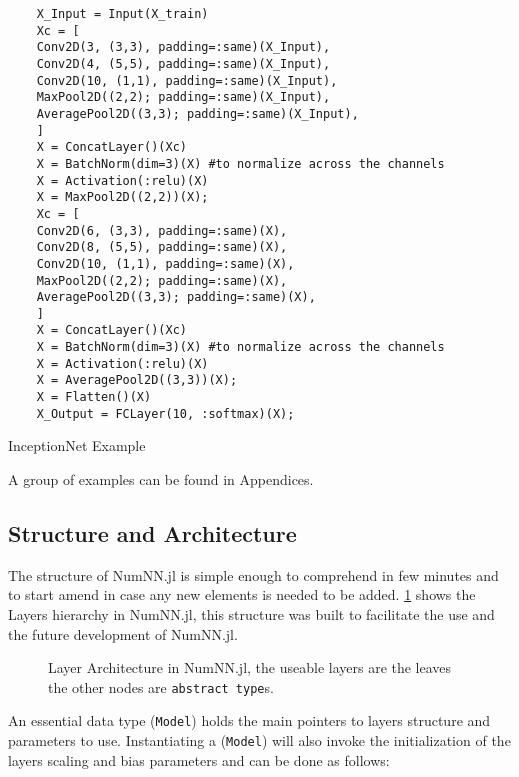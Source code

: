 \begin{listing}[H]
	\begin{verbatim}
	X_Input = Input(X_train)
	Xc = [
	Conv2D(3, (3,3), padding=:same)(X_Input),
	Conv2D(4, (5,5), padding=:same)(X_Input),
	Conv2D(10, (1,1), padding=:same)(X_Input),
	MaxPool2D((2,2); padding=:same)(X_Input),
	AveragePool2D((3,3); padding=:same)(X_Input),
	]
	X = ConcatLayer()(Xc)
	X = BatchNorm(dim=3)(X) #to normalize across the channels
	X = Activation(:relu)(X)
	X = MaxPool2D((2,2))(X);
	Xc = [
	Conv2D(6, (3,3), padding=:same)(X),
	Conv2D(8, (5,5), padding=:same)(X),
	Conv2D(10, (1,1), padding=:same)(X),
	MaxPool2D((2,2); padding=:same)(X),
	AveragePool2D((3,3); padding=:same)(X),
	]
	X = ConcatLayer()(Xc)
	X = BatchNorm(dim=3)(X) #to normalize across the channels
	X = Activation(:relu)(X)
	X = AveragePool2D((3,3))(X);
	X = Flatten()(X)
	X_Output = FCLayer(10, :softmax)(X);
	\end{verbatim}
	\caption{InceptionNet Example}\label{chain}
\end{listing}

A group of examples can be found in Appendices.

\subsection{Structure and Architecture}

The structure of NumNN.jl is simple enough to comprehend in few minutes and to start amend in case any new elements is needed to be added. \figurename\ref{fig:layerstruct} shows the Layers hierarchy in NumNN.jl, this structure was built to facilitate the use and the future development of NumNN.jl.

\begin{figure}[!ht]
	\centering
		
	\caption{Layer Architecture in NumNN.jl, the useable layers are the leaves the other nodes are \texttt{abstract type}s.}\label{fig:layerstruct}
\end{figure}

An essential data type (\texttt{Model}) holds the main pointers to layers structure and parameters to use. Instantiating a (\texttt{Model}) will also invoke the initialization of the layers scaling and bias parameters and can be done as follows:

